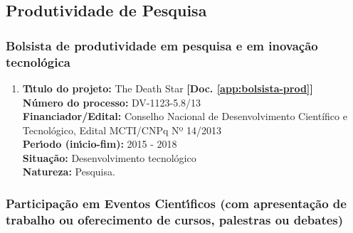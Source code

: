 \documentclass[a4paper,oneside,10pt]{article}
\begin{document}
\subsection{Produtividade de Pesquisa}
\vspace{0.3cm}


\subsubsection{Bolsista de produtividade em pesquisa e em inova\c{c}\~{a}o tecnol\'{o}gica}
\vspace{0.3cm}

\begin{enumerate}
\renewcommand{\labelenumi}{{\large\bfseries\arabic{enumi}.}}

\item \textbf{T\'{\i}tulo do projeto:} The Death Star \textbf{[Doc. \ref{app:bolsista-prod}]}\\
      \textbf{N\'{u}mero do processo:} DV-1123-5.8/13\\
      \textbf{Financiador/Edital:} Conselho Nacional de Desenvolvimento Científico e Tecnológico, Edital MCTI/CNPq Nº 14/2013\\
      \textbf{Per\'{\i}odo (in\'{\i}cio-fim):} 2015 - 2018\\
      \textbf{Situação:} Desenvolvimento tecnológico\\
      \textbf{Natureza:} Pesquisa.

\end{enumerate}


\subsubsection{Participa\c{c}\~{a}o em Eventos Cient\'{\i}ficos (com apresenta\c{c}\~{a}o de trabalho ou oferecimento de cursos, palestras ou debates)}
\vspace{0.3cm}
\end{document}
